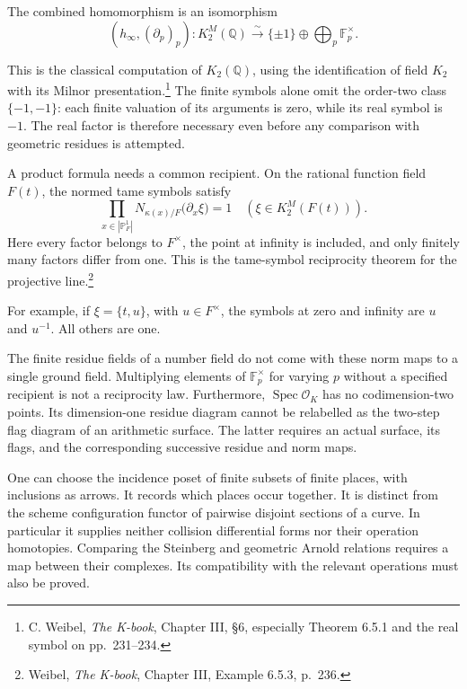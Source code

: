 \begin{theorem}
\label{v4-arith:coefficients:thm:tate}
The combined homomorphism is an isomorphism
\[
 (h_\infty,(\partial_p)_p):K^M_2(\mathbb Q)
 \xrightarrow{\sim}
 \{\pm1\}\oplus\bigoplus_p\mathbb F_p^\times.
\]
\end{theorem}

This is the classical computation of \(K_2(\mathbb Q)\), using
the identification of field \(K_2\) with its Milnor presentation.\footnote{
C. Weibel, \emph{The K-book}, Chapter III, \S6, especially
Theorem 6.5.1 and the real symbol on pp.~231--234.}
The finite symbols alone omit the order-two class \(\{-1,-1\}\):
each finite valuation of its arguments is zero, while its real symbol
is \(-1\). The real factor is therefore necessary even before any
comparison with geometric residues is attempted.

A product formula needs a common recipient. On the rational function
field \(F(t)\), the normed tame symbols satisfy
\begin{equation}\label{v4-arith:coefficients:eq:curve-reciprocity}
 \prod_{x\in|\mathbb P^1_F|}
 N_{\kappa(x)/F}\bigl(\partial_x\xi\bigr)=1
 \quad(\xi\in K^M_2(F(t))).
\end{equation}
Here every factor belongs to \(F^\times\), the point at infinity
is included, and only finitely many factors differ from one.
This is the tame-symbol reciprocity theorem for the projective
line.\footnote{Weibel, \emph{The K-book}, Chapter III,
Example 6.5.3, p.~236.}

For example, if
\(\xi=\{t,u\}\), with \(u\in F^\times\), the symbols at zero
and infinity are \(u\) and \(u^{-1}\). All others are one.

The finite residue fields of a number field do not come with these
norm maps to a single ground field. Multiplying elements of
\(\mathbb F_p^\times\) for varying \(p\) without a specified
recipient is not a reciprocity law. Furthermore,
\(\operatorname{Spec}\mathcal O_K\) has no codimension-two points.
Its dimension-one residue diagram cannot be relabelled as the
two-step flag diagram of an arithmetic surface. The latter requires
an actual surface, its flags, and the corresponding successive residue
and norm maps.

One can choose the incidence poset of finite subsets of finite places,
with inclusions as arrows. It records which places occur together.
It is distinct from the scheme configuration functor of pairwise
disjoint sections of a curve. In particular it supplies neither
collision differential forms nor their operation homotopies.
Comparing the Steinberg and geometric Arnold relations requires a map
between their complexes. Its compatibility with the relevant operations
must also be proved.

